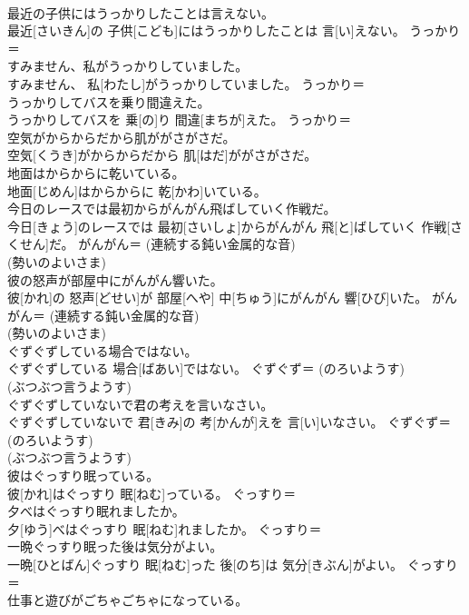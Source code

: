 \documentclass[8pt]{extreport}
\begin{document}
\begin{CJK}{UTF8}{min}
{\\	最近の子供にはうっかりしたことは言えない。	
\\	最近[さいきん]の 子供[こども]にはうっかりしたことは 言[い]えない。	うっかり＝ 
\\	すみません、私がうっかりしていました。	
\\	すみません、 私[わたし]がうっかりしていました。	うっかり＝ 
\\	うっかりしてバスを乗り間違えた。	
\\	うっかりしてバスを 乗[の]り 間違[まちが]えた。	うっかり＝ 
\\	空気がからからだから肌ががさがさだ。	
\\	空気[くうき]がからからだから 肌[はだ]ががさがさだ。	
\\	地面はからからに乾いている。	
\\	地面[じめん]はからからに 乾[かわ]いている。	
\\	今日のレースでは最初からがんがん飛ばしていく作戦だ。	
\\	今日[きょう]のレースでは 最初[さいしょ]からがんがん 飛[と]ばしていく 作戦[さくせん]だ。	がんがん＝ (連続する鈍い金属的な音) 
\\	(勢いのよいさま)
\\	彼の怒声が部屋中にがんがん響いた。	
\\	彼[かれ]の 怒声[どせい]が 部屋[へや] 中[ちゅう]にがんがん 響[ひび]いた。	がんがん＝ (連続する鈍い金属的な音) 
\\	(勢いのよいさま)
\\	ぐずぐずしている場合ではない。	
\\	ぐずぐずしている 場合[ばあい]ではない。	ぐずぐず＝ (のろいようす) 
\\	(ぶつぶつ言うようす)
\\	ぐずぐずしていないで君の考えを言いなさい。	
\\	ぐずぐずしていないで 君[きみ]の 考[かんが]えを 言[い]いなさい。	ぐずぐず＝ (のろいようす) 
\\	(ぶつぶつ言うようす)
\\	彼はぐっすり眠っている。	
\\	彼[かれ]はぐっすり 眠[ねむ]っている。	ぐっすり＝ 
\\	夕べはぐっすり眠れましたか。	
\\	夕[ゆう]べはぐっすり 眠[ねむ]れましたか。	ぐっすり＝ 
\\	一晩ぐっすり眠った後は気分がよい。	
\\	一晩[ひとばん]ぐっすり 眠[ねむ]った 後[のち]は 気分[きぶん]がよい。	ぐっすり＝ 
\\	仕事と遊びがごちゃごちゃになっている。	
}
\end{CJK}
\end{document}
